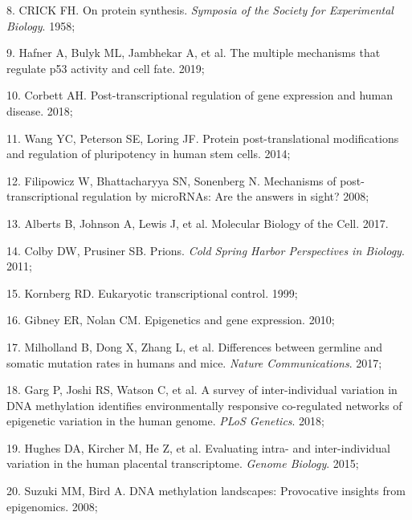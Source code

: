 \documentclass[11pt,oneside]{bristolthesis}
\newenvironment{cslreferences}%
  {}%
  {\par}
\begin{document}
\begin{cslreferences}
\leavevmode\hypertarget{ref-CRICK1958}{}%
8. CRICK FH. On protein synthesis. \emph{Symposia of the Society for Experimental Biology}. 1958;

\leavevmode\hypertarget{ref-Hafner2019}{}%
9. Hafner A, Bulyk ML, Jambhekar A, et al. The multiple mechanisms that regulate p53 activity and cell fate. 2019;

\leavevmode\hypertarget{ref-Corbett2018}{}%
10. Corbett AH. Post-transcriptional regulation of gene expression and human disease. 2018;

\leavevmode\hypertarget{ref-Wang2014}{}%
11. Wang YC, Peterson SE, Loring JF. Protein post-translational modifications and regulation of pluripotency in human stem cells. 2014;

\leavevmode\hypertarget{ref-Filipowicz2008}{}%
12. Filipowicz W, Bhattacharyya SN, Sonenberg N. Mechanisms of post-transcriptional regulation by microRNAs: Are the answers in sight? 2008;

\leavevmode\hypertarget{ref-Alberts2017}{}%
13. Alberts B, Johnson A, Lewis J, et al. Molecular Biology of the Cell. 2017.

\leavevmode\hypertarget{ref-Colby2011}{}%
14. Colby DW, Prusiner SB. Prions. \emph{Cold Spring Harbor Perspectives in Biology}. 2011;

\leavevmode\hypertarget{ref-Kornberg1999}{}%
15. Kornberg RD. Eukaryotic transcriptional control. 1999;

\leavevmode\hypertarget{ref-Gibney2010}{}%
16. Gibney ER, Nolan CM. Epigenetics and gene expression. 2010;

\leavevmode\hypertarget{ref-Milholland2017}{}%
17. Milholland B, Dong X, Zhang L, et al. Differences between germline and somatic mutation rates in humans and mice. \emph{Nature Communications}. 2017;

\leavevmode\hypertarget{ref-Garg2018}{}%
18. Garg P, Joshi RS, Watson C, et al. A survey of inter-individual variation in DNA methylation identifies environmentally responsive co-regulated networks of epigenetic variation in the human genome. \emph{PLoS Genetics}. 2018;

\leavevmode\hypertarget{ref-Hughes2015}{}%
19. Hughes DA, Kircher M, He Z, et al. Evaluating intra- and inter-individual variation in the human placental transcriptome. \emph{Genome Biology}. 2015;

\leavevmode\hypertarget{ref-Suzuki2008}{}%
20. Suzuki MM, Bird A. DNA methylation landscapes: Provocative insights from epigenomics. 2008;


\end{cslreferences}
\end{document}
